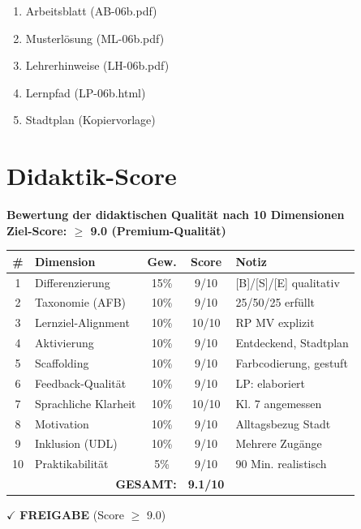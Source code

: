\documentclass[11pt,a4paper]{article}
\begin{document}
\begin{enumerate}
    \item Arbeitsblatt (AB-06b.pdf)
    \item Musterlösung (ML-06b.pdf)
    \item Lehrerhinweise (LH-06b.pdf)
    \item Lernpfad (LP-06b.html)
    \item Stadtplan (Kopiervorlage)
\end{enumerate}

\newpage
\section{Didaktik-Score}

\begin{scorebox}
\textbf{Bewertung der didaktischen Qualität nach 10 Dimensionen}\\
\textbf{Ziel-Score: $\geq$ 9.0 (Premium-Qualität)}

\vspace{1em}
\begin{tabular}{|c|l|c|c|p{4cm}|}
\hline
\textbf{\#} & \textbf{Dimension} & \textbf{Gew.} & \textbf{Score} & \textbf{Notiz} \\
\hline
1 & Differenzierung & 15\% & 9/10 & [B]/[S]/[E] qualitativ \\
\hline
2 & Taxonomie (AFB) & 10\% & 9/10 & 25/50/25 erfüllt \\
\hline
3 & Lernziel-Alignment & 10\% & 10/10 & RP MV explizit \\
\hline
4 & Aktivierung & 10\% & 9/10 & Entdeckend, Stadtplan \\
\hline
5 & Scaffolding & 10\% & 9/10 & Farbcodierung, gestuft \\
\hline
6 & Feedback-Qualität & 10\% & 9/10 & LP: elaboriert \\
\hline
7 & Sprachliche Klarheit & 10\% & 10/10 & Kl. 7 angemessen \\
\hline
8 & Motivation & 10\% & 9/10 & Alltagsbezug Stadt \\
\hline
9 & Inklusion (UDL) & 10\% & 9/10 & Mehrere Zugänge \\
\hline
10 & Praktikabilität & 5\% & 9/10 & 90 Min. realistisch \\
\hline
\multicolumn{3}{|r|}{\textbf{GESAMT:}} & \textbf{9.1/10} & \\
\hline
\end{tabular}

\vspace{1em}
$\checkmark$ \textcolor{successgreen}{\textbf{FREIGABE} (Score $\geq$ 9.0)}
\end{scorebox}
\end{document}
